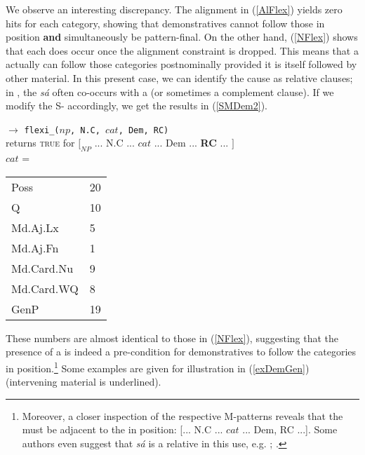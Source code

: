 \documentclass[output=paper,colorlinks,citecolor=brown,draft]{langscibook}
\begin{document}
\begin{sloppypar}
We observe an interesting discrepancy. 
The alignment  in (\ref{AlFlex}) yields zero hits for each category, showing that demonstratives cannot follow those in  position \textbf{and} simultaneously be pattern-final. On the other hand, (\ref{NFlex}) shows that each  does occur once the alignment constraint is dropped. This means that a  actually can follow those categories postnominally provided it is itself followed by other material. In this present case, we can identify the cause as relative clauses; in , the  \textit{sá} often co-occurs with a  (or sometimes a complement clause).  If we modify the S- accordingly, we get the results in (\ref{SMDem2}).
\end{sloppypar}


\begin{exe} \small
  \ex \label{SMDem2} $\rightarrow$   \texttt{flexi\_($np$, N.C, $cat$, Dem, RC)} \\
       \indent \hfill returns \textsc{true} for $[_{NP}$  ... N.C  ...  $cat$ ...  Dem ... {\bfseries RC} ...   $]$ \\

$cat$ = 
\begin{tabular}{l l }
\midrule	Poss 			&	20 \\
	Q 			    &	10 \\
	Md.Aj.Lx 		&	5 \\
	Md.Aj.Fn		& 	1   \\
	Md.Card.Nu  	& 	9     \\
	Md.Card.WQ  	& 	8  \\
	GenP 		 	&	19  \\
\midrule\end{tabular}
\end{exe}  



These numbers are almost identical to those in (\ref{NFlex}), suggesting that the presence of a  is indeed a pre-condition for demonstratives to follow the categories in  position.\footnote{Moreover, a closer inspection of the respective M-patterns reveals that the  must be adjacent to the  in  position: [... N.C ... $cat$ ... Dem, RC ...].  Some authors even suggest that \textit{sá} is a relative  in this use, e.g. \citet{wagenerRC}; \citet{sapp2019RC}. } Some examples are given for illustration in (\ref{exDemGen}) (intervening material is underlined). 
\end{document}
